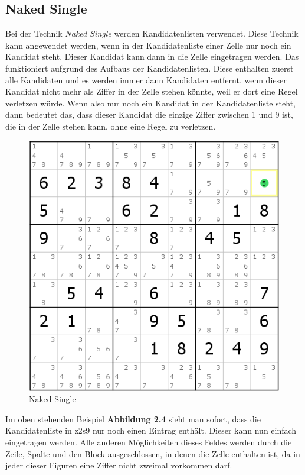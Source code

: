 \newpage
\subsection{Naked Single}
\label{Naked_Single}
Bei der Technik \textit{Naked Single} werden Kandidatenlisten verwendet. Diese Technik kann angewendet werden, wenn in der Kandidatenliste einer Zelle nur noch ein Kandidat steht. Dieser Kandidat kann dann in die Zelle eingetragen werden. Das funktioniert aufgrund des Aufbaus der Kandidatenlisten. Diese enthalten zuerst alle Kandidaten und es werden immer dann Kandidaten entfernt, wenn dieser Kandidat nicht mehr als Ziffer in der Zelle stehen könnte, weil er dort eine Regel verletzen würde. Wenn also nur noch ein Kandidat in der Kandidatenliste steht, dann bedeutet das, dass dieser Kandidat die einzige Ziffer zwischen 1 und 9 ist, die in der Zelle stehen kann, ohne eine Regel zu verletzen.

\begin{figure}[h]
\begin{center}
\includegraphics{./img/naked_single.png}
\caption{Naked Single}
\end{center}
\end{figure}

\noindent Im oben stehenden Beispiel \textbf{Abbildung 2.4} sieht man sofort, dass die Kandidatenliste in z2s9 nur noch einen Eintrag enthält. Dieser kann nun einfach eingetragen werden. Alle anderen Möglichkeiten dieses Feldes werden durch die Zeile, Spalte und den Block ausgeschlossen, in denen die Zelle enthalten ist, da in jeder dieser Figuren eine Ziffer nicht zweimal vorkommen darf.
